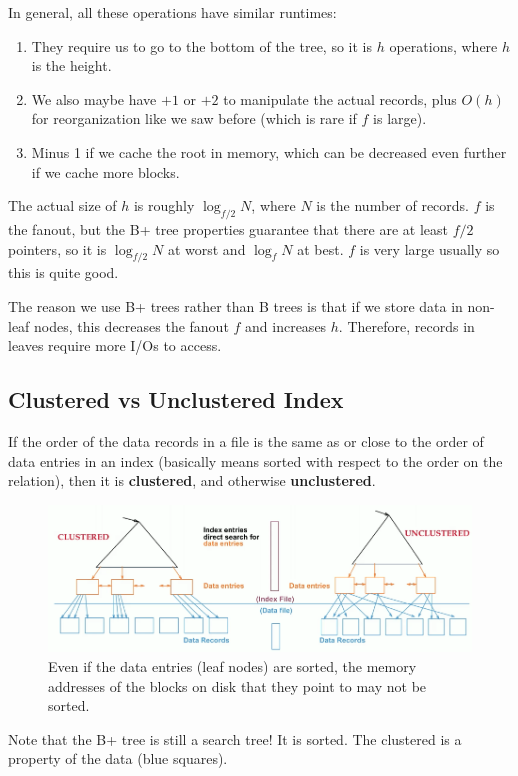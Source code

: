 \documentclass{article}
\begin{document}
    In general, all these operations have similar runtimes: 
    \begin{enumerate}
      \item They require us to go to the bottom of the tree, so it is $h$ operations, where $h$ is the height. 
      \item We also maybe have $+1$ or $+2$ to manipulate the actual records, plus $O(h)$ for reorganization like we saw before (which is rare if $f$ is large). 
      \item Minus 1 if we cache the root in memory, which can be decreased even further if we cache more blocks. 
    \end{enumerate}
    
    The actual size of $h$ is roughly $\log_{f/2} {N}$, where $N$ is the number of records. $f$ is the fanout, but the B+ tree properties guarantee that there are at least $f/2$ pointers, so it is $\log_{f/2} N$ at worst and $\log_{f} N$ at best. $f$ is very large usually so this is quite good. 

    The reason we use B+ trees rather than B trees is that if we store data in non-leaf nodes, this decreases the fanout $f$ and increases $h$. Therefore, records in leaves require more I/Os to access. 

  \subsection{Clustered vs Unclustered Index}

    \begin{definition}
      If the order of the data records in a file is the same as or close to the order of data entries in an index (basically means sorted with respect to the order on the relation), then it is \textbf{clustered}, and otherwise \textbf{unclustered}. 

      \begin{figure}[H]
        \centering 
        \includegraphics[scale=0.4]{img/clustered_vs_unclustered.png}
        \caption{Even if the data entries (leaf nodes) are sorted, the memory addresses of the blocks on disk that they point to may not be sorted.} 
        \label{fig:clustered_vs_unclustered}
      \end{figure}

      Note that the B+ tree is still a search tree! It is sorted. The clustered is a property of the data (blue squares). 
    \end{definition}
\end{document}
